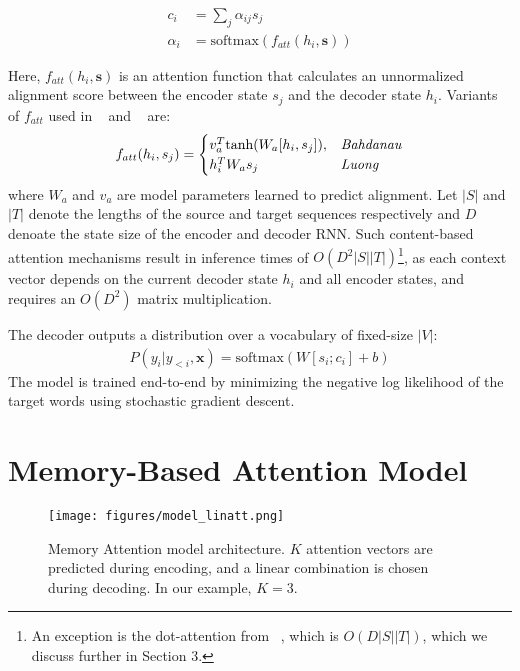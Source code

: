 \documentclass[11pt,letterpaper]{article}
\begin{document}
\begin{align}
c_i & = \sum_{j}{\alpha_{ij} s_j} \\
{\alpha}_{i} & = \text{softmax}(f_{att}(h_i, \mathbf{s}))
\end{align}

Here, $f_{att}(h_i, \mathbf{s})$ is an attention function that calculates an unnormalized alignment score between the encoder state $s_j$ and the decoder state $h_i$. Variants of $f_{att}$ used in ~\citet{Bahdanau:2014} and ~\citet{Luong:2015} are:
\[
    f_{att}(h_i, s_j)= 
\begin{cases}
    v_a^T \text{tanh}(W_a[h_i, s_j]),& \emph{Bahdanau} \\
    h_i^TW_as_j & \emph{Luong} 
\end{cases}
\]
where $W_a$ and $v_a$ are model parameters learned to predict alignment. Let $|S|$ and $|T|$ denote the lengths of the source and target sequences respectively and $D$ denoate the state size of the encoder and decoder RNN. Such content-based attention mechanisms result in inference times of $O(D^2|S||T|)$\footnote{An exception is the dot-attention from ~\citet{Luong:2015}, which is $O(D|S||T|)$, which we discuss further in Section 3.}, as each context vector depends on the current decoder state $h_i$ and all encoder states, and requires an $O(D^2)$ matrix multiplication.

The decoder outputs a distribution over a vocabulary of fixed-size $|V|$:
\begin{align}P(y_i \vert y_{<i}, \mathbf{x}) = \text{softmax}(W[s_i; c_i] + b)\end{align}
The model is trained end-to-end by minimizing the negative log likelihood of the target words using stochastic gradient descent.

\section{Memory-Based Attention Model}
\label{sec:model}

\begin{figure*}[ht]
    \centering
    \texttt{[image: figures/model\_linatt.png]}
    \caption{Memory Attention model architecture. $K$ attention vectors are predicted during encoding, and a linear combination is chosen during decoding. In our example, $K=3$.}
    \label{fig:model}
\end{figure*}
\end{document}
